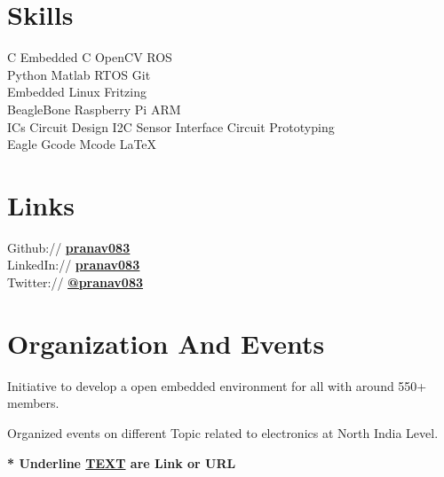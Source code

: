\documentclass[]{font}
\begin{document}
\begin{minipage}[t]{0.30\textwidth}
\section{Skills}
C \textbullet{}  Embedded C \textbullet{} OpenCV \textbullet{} ROS \\
Python \textbullet{} Matlab \textbullet{} RTOS   \textbullet{} Git \\
Embedded Linux \textbullet{} Fritzing \\ 
BeagleBone \textbullet{} Raspberry Pi \textbullet{} ARM \\
 ICs \textbullet{} Circuit Design \textbullet{} I2C \textbullet{} Sensor Interface \textbullet{} Circuit Prototyping  \\
Eagle \textbullet{} Gcode \textbullet{} Mcode \textbullet{} \LaTeX\ \\
\sectionsep



\section{Links} 
Github://   \href{https://github.com/pranav083}{\underline{\textbf{ pranav083}}} \\
LinkedIn:// \href{https://www.linkedin.com/in/pranav083}{\underline{\bf pranav083}} \\
Twitter://  \href{https://twitter.com/pranav083}{\underline{\bf @pranav083}} \\




\section{Organization And Events}
\textbullet{}Initiative to develop a open embedded environment for all with around 550+ members.
\sectionsep

\vspace{\topsep} %
\textbullet{}Organized events on different Topic related to electronics at North India Level.
\sectionsep

\textbf{\** Underline \underline{TEXT} are Link or URL}
%
%

\end{minipage} 
\end{document}
